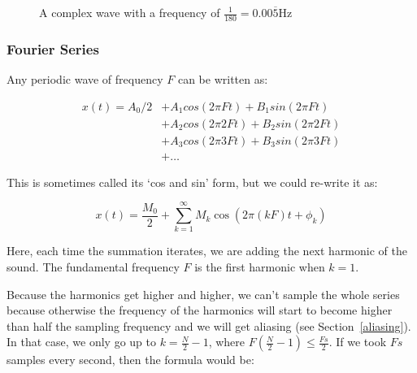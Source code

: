 \begin{figure}
  \centering
  \caption{A complex wave with a frequency of
  $\frac{1}{180} = 0.00\overline{5}\si{\hertz}$}
  \label{fig-complex-wave}
\end{figure} 

\subsubsection{Fourier Series}

Any periodic wave of frequency $F$ can be written as:

\begin{align*}
  x(t) = A_0 / 2 &+ A_1 cos(2 \pi Ft) + B_1 sin(2\pi Ft)\\
                 &+ A_2 cos(2 \pi 2Ft) + B_2 sin(2\pi 2Ft)\\
                 &+ A_3 cos(2 \pi 3Ft) + B_3 sin(2\pi 3Ft)\\
                 &+ \dots
\end{align*}

This is sometimes called its `cos and sin' form, but we could re-write it as:

\[
  x(t) = \frac{M_0}{2} + \sum\limits^\infty_{k=1}M_k\cos(2\pi (kF)t + \phi_k)
\]

Here, each time the summation iterates, we are adding the next harmonic of the
sound. The fundamental frequency $F$ is the first harmonic when $k=1$.

Because the harmonics get higher and higher, we can't sample the whole series
because otherwise the frequency of the harmonics will start to become higher
than half the sampling frequency and we will get aliasing (see
Section~\ref{aliasing}). In that case, we only go up to $k=\frac{N}{2} - 1$,
where $F(\frac{N}{2} - 1) \le \frac{Fs}{2}$. If we took $Fs$ samples every
second, then the formula would be:


